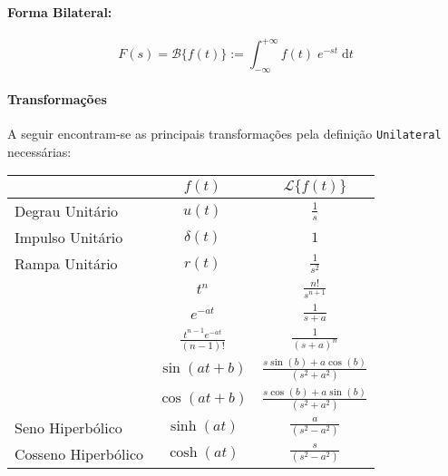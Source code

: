 \documentclass{article}
\begin{document}
        \begin{multicols}{2}
            \raggedcolumns
            \paragraph{Forma Bilateral:}
                \begin{equation}
                    \boxed{
                        F(s) = \mathcal{B} \{ f(t) \} := \int_{-\infty}^{+\infty} f(t) \; e^{-st} \; \text{d}t
                    }
                \end{equation}

            \columnbreak

            \paragraph{Transformações}A seguir encontram-se as principais transformações pela definição \texttt{Unilateral} necessárias:
                \begin{table}[H]
                    \centering
                    \begingroup
                    \renewcommand{\arraystretch}{1.25}
                    \begin{tabular}[]{lcc}
                                         & $f(t)$      & $\mathcal{L}\{ f(t) \}$\\\hline
                        Degrau Unitário  & $u(t)$      & $\frac{1}{s}$\\
                        Impulso Unitário & $\delta(t)$ & $1$\\
                        Rampa Unitário   & $r(t)$      & $\frac{1}{s^2}$\\
                                         & $t^{n}$     & $\frac{n!}{s^{n+1}}$\\
                                         & $e^{-at}$   & $\frac{1}{s+a}$\\
                                         & $\frac{t^{n-1}e^{-at}}{(n-1)!}$  & $\frac{1}{(s+a)^{n}}$\\
                                         & $\sin(at + b)$  & $\frac{s\sin(b) + a\cos(b)}{(s^2+a^2)}$\\
                                         & $\cos(at + b)$  & $\frac{s\cos(b) + a\sin(b)}{(s^2+a^2)}$\\
                        Seno Hiperbólico    & $\sinh(at)$  & $\frac{a}{(s^2-a^2)}$\\
                        Cosseno Hiperbólico & $\cosh(at)$  & $\frac{s}{(s^2-a^2)}$\\

\end{tabular}
\end{table}
\end{multicols}
\end{document}
